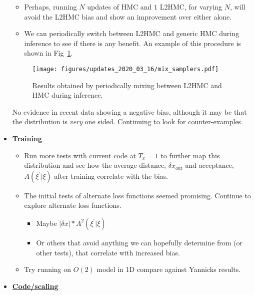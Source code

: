 \begin{itemize}
\begin{itemize}
      \item Perhaps, running \(N\) updates of HMC and \(1\) L2HMC, for varying \(N\),
        will avoid the L2HMC bias and show an improvement over either alone.
      \item We can periodically switch between L2HMC and generic HMC during
        inference to see if there is any benefit. An example of this procedure
        is shown in Fig~\ref{fig:mixed_samplers}.
    \end{itemize}
    \begin{figure}
      \centering
      \texttt{[image: figures/updates\_2020\_03\_16/mix\_samplers.pdf]}
      \caption{Results obtained by periodically mixing between L2HMC and HMC
      during inference.}%
      \label{fig:mixed_samplers}
    \end{figure}
    \begin{todolist}
       No evidence in recent
      data showing a negative bias, although it may be that the distribution is
      \emph{very} one sided. Continuing to look for counter-examples.
    \end{todolist}
  \item \textbf{\uline{Training}}
    \begin{itemize}
      \item \textbf{\color{red}{(AI5)}} Run more tests with current code at \(T_{x} = 1\) to
        further map this distribution and see how the average distance,
        \(\delta x_{\mathrm{out}}\) and acceptance, \(A(\xi^{\prime}|\xi)\)
        after training correlate with the bias.
      \item \textbf{\color{red}{(AI6)}} The initial tests of alternate loss functions seemed
        promising. Continue to explore alternate loss functions.
        \begin{itemize}
          \item Maybe \(|\delta x| * A^{2}(\xi^{\prime}|\xi)\)
          \item Or others that avoid anything we can hopefully determine from
            \textbf{\color{red}{(AI5)}} (or other tests), that correlate with increased bias.
        \end{itemize}
      \item Try running on \(O(2)\) model in 1D compare against Yannicks
        results.
    \end{itemize}
  \item \textbf{\uline{Code/scaling}}

\end{itemize}
